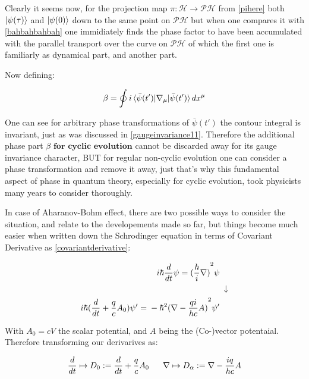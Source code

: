\documentclass[8pt, twocoloumn]{article}
\begin{document}
Clearly it seems now, for the projection map $\pi: \mathcal{H} \to \mathcal{PH}$ from \ref{pihere} both $\ket{\psi(\tau)}$  and $\ket{\psi(0)}$ down to the same point on $\mathcal{PH}$ but when one compares it with \ref{bahbahbahbah} one immidiately finds the phase factor to have been accumulated with the parallel transport over the curve on $\mathcal{PH}$ of which the first one is familiarly as dynamical part, and another part. 

Now defining:

\begin{align}
    \beta =   \oint i \braket{\bar{\psi}(t')|\nabla_{\mu}|\bar{\psi}(t')}dx^{\mu} 
\end{align}

One can see for arbitrary phase transformations of $\bar{\psi}(t')$ the contour integral is invariant, just as was discussed in \ref{gaugeinvariance11}. Therefore the additional phase part $\beta$ $\textbf{for cyclic evolution}$ cannot be discarded away for its gauge invariance character, BUT for regular non-cyclic evolution one can consider a phase transformation and remove it away, just that's why this fundamental aspect of phase in quantum theory, especially for cyclic evolution, took physicists many years to consider thoroughly. 

In case of Aharanov-Bohm effect, there are two possible ways to consider the situation, and relate to the developements made so far, but things become much easier when written down the Schrodinger equation in terms of Covariant Derivative as \ref{covariantderivative}:

\begin{align}{\label{electromagneticschrodingereequatinon}}
\begin{split}
     i\hbar \frac{d}{dt} \psi ={}& {(\frac{\hbar}{i} \nabla)}^2 \psi
\end{split}\\
\begin{split}
   	\downarrow
\end{split}\\
\begin{split}
    i\hbar (\frac{d}{dt} + \frac{q}{c} A_0) \psi' ={}& -{\hbar}^2{( \nabla - \frac{qi}{hc} A) }^2 \psi'
\end{split}
\end{align}

With $A_0 = cV$ the scalar potential, and $A$ being the (Co-)vector potentaial. Therefore transforming our derivarives as:

\begin{align}{\label{againemconnection}}
    \frac{d}{dt} \mapsto D_0 := \frac{d}{dt} + \frac{q}{c} A_0 \ \ \ \ \ \nabla \mapsto D_{\alpha}:=\nabla - \frac{iq}{hc} A 
\end{align}
\end{document}

